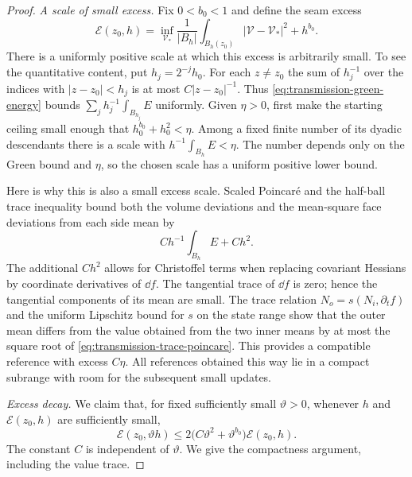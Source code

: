 \begin{proof}
\smallskip\noindent\emph{A scale of small excess.}
Fix $0<b_0<1$ and define the seam excess
\begin{equation}
 \mathcal E(z_0,h)=
 \inf_{\mathcal V_*}\frac{1}{|B_h|}\int_{B_h(z_0)}
          |\mathcal V-\mathcal V_*|^2+h^{b_0}.
 \label{eq:transmission-excess}
\end{equation}
There is a uniformly positive scale at which this excess is arbitrarily
small.  To see the quantitative content, put $h_j=2^{-j}h_0$.  For each
$z\ne z_0$ the sum of $h_j^{-1}$ over the indices with $|z-z_0|<h_j$
is at most $C|z-z_0|^{-1}$.  Thus
\eqref{eq:transmission-green-energy} bounds
$\sum_j h_j^{-1}\int_{B_{h_j}}E$ uniformly.  Given $\eta>0$, first
make the starting ceiling small enough that $h_0^{b_0}+h_0^2<\eta$.
Among a fixed finite number of its dyadic descendants there is a scale
with $h^{-1}\int_{B_h}E<\eta$.  The number depends only on the
Green bound and $\eta$, so the chosen scale has a uniform positive
lower bound.

Here is why this is also a small excess scale.  Scaled Poincar\'e and
the half-ball trace inequality bound both the volume deviations and the
mean-square face deviations from each side mean by
\begin{equation}
 C h^{-1}\int_{B_h}E+Ch^2.
 \label{eq:transmission-trace-poincare}
\end{equation}
The additional $Ch^2$ allows for Christoffel terms when replacing
covariant Hessians by coordinate derivatives of $\dd f$.  The
tangential trace of $\dd f$ is zero; hence the tangential components of
its mean are small.  The trace relation $N_o=s(N_i,\partial_t f)$ and
the uniform Lipschitz bound for $s$ on the state range show that the
outer mean differs from the value obtained from the two inner means by
at most the square root of \eqref{eq:transmission-trace-poincare}.
This provides a compatible reference with excess $C\eta$.  All
references obtained this way lie in a compact subrange with room for
the subsequent small updates.

\smallskip\noindent\emph{Excess decay.}
We claim that, for fixed sufficiently small $\vartheta>0$, whenever
$h$ and $\mathcal E(z_0,h)$ are sufficiently small,
\begin{equation}
 \mathcal E(z_0,\vartheta h)
 \leq 2\bigl(C\vartheta^2+\vartheta^{b_0}\bigr)
                    \mathcal E(z_0,h).
 \label{eq:transmission-excess-decay}
\end{equation}
The constant $C$ is independent of $\vartheta$.  We give the
compactness argument, including the value trace.


\end{proof}
